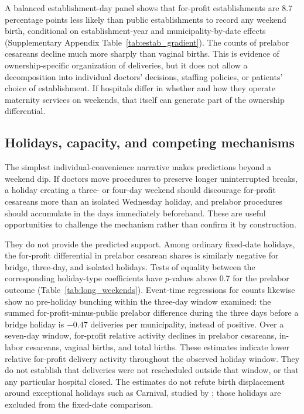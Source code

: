 \documentclass[12pt]{article}
\newcommand{\satab}[1]{Supplementary Appendix Table~\ref{#1}}
\begin{document}
A balanced establishment-day panel shows that for-profit establishments are 8.7 percentage points less likely than public establishments to record any weekend birth, conditional on establishment-year and municipality-by-date effects (\satab{tab:estab_gradient}). The counts of prelabor cesareans decline much more sharply than vaginal births. This is evidence of ownership-specific organization of deliveries, but it does not allow a decomposition into individual doctors' decisions, staffing policies, or patients' choice of establishment. If hospitals differ in whether and how they operate maternity services on weekends, that itself can generate part of the ownership differential.

\subsection{Holidays, capacity, and competing mechanisms}\label{sec:capacity}

The simplest individual-convenience narrative makes predictions beyond a weekend dip. If doctors move procedures to preserve longer uninterrupted breaks, a holiday creating a three- or four-day weekend should discourage for-profit cesareans more than an isolated Wednesday holiday, and prelabor procedures should accumulate in the days immediately beforehand. These are useful opportunities to challenge the mechanism rather than confirm it by construction.

They do not provide the predicted support. Among ordinary fixed-date holidays, the for-profit differential in prelabor cesarean shares is similarly negative for bridge, three-day, and isolated holidays. Tests of equality between the corresponding holiday-type coefficients have $p$-values above 0.7 for the prelabor outcome (Table~\ref{tab:long_weekends}). Event-time regressions for counts likewise show no pre-holiday bunching within the three-day window examined: the summed for-profit-minus-public prelabor difference during the three days before a bridge holiday is $-0.47$ deliveries per municipality, instead of positive. Over a seven-day window, for-profit relative activity declines in prelabor cesareans, in-labor cesareans, vaginal births, and total births. These estimates indicate lower relative for-profit delivery activity throughout the observed holiday window. They do not establish that deliveries were not rescheduled outside that window, or that any particular hospital closed. The estimates do not refute birth displacement around exceptional holidays such as Carnival, studied by \citet{melo2024}; those holidays are excluded from the fixed-date comparison.
\end{document}
